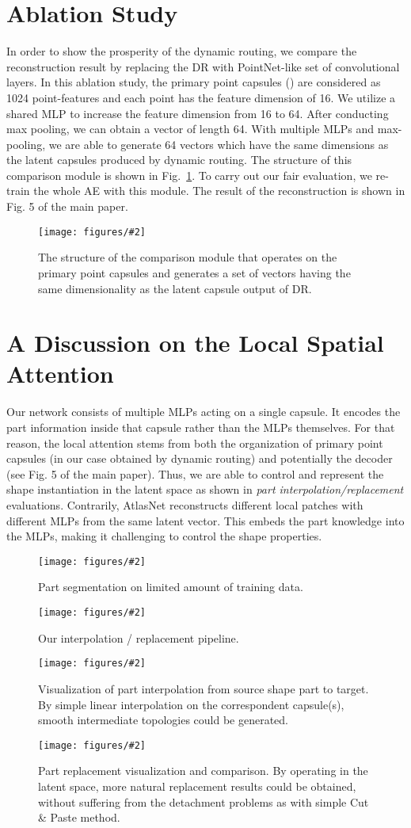 \documentclass[10pt,twocolumn,letterpaper]{article}
\theoremstyle{break}
\newcommand{\insertimageC}[5]{ \begin{figure}[#5]
\centering
\texttt{[image: figures/\#2]}
\caption{#3}
\label{#4}
\end{figure}
}
\newcommand{\insertimageStar}[5]{ \begin{figure*}[#5]
\centering
\texttt{[image: figures/\#2]}
\caption{#3}
\label{#4}
\end{figure*}
}
\begin{document}
\section{Ablation Study}
In order to show the prosperity of the dynamic routing, we compare the reconstruction result by replacing the DR with PointNet-like set of convolutional layers. In this ablation study, the primary point capsules () are considered as 1024 point-features and each point has the feature dimension of 16. We utilize a shared MLP to increase the feature dimension from 16 to 64. After conducting max pooling, we can obtain a vector of length 64. With multiple MLPs and max-pooling, we are able to generate 64 vectors which have the same dimensions as the latent capsules produced by dynamic routing. The structure of this comparison module is shown in Fig.~\ref{fig:supp-convcompare}. To carry out our fair evaluation, we re-train the whole AE with this module. The result of the reconstruction is shown in Fig. 5 of the main paper.
\insertimageC{1}{conv_compare.pdf}{The structure of the comparison module that operates on the primary point capsules and generates a set of vectors having the same dimensionality as the latent capsule output of DR.}{fig:supp-convcompare}{hbtp}

\section{A Discussion on the Local Spatial Attention}
Our network consists of multiple MLPs acting on a single capsule. It encodes the part information inside that capsule rather than the MLPs themselves.
For that reason, the local attention stems from both the organization of primary point capsules (in our case obtained by dynamic routing) and potentially the decoder (see Fig. 5 of the main paper). Thus, we are able to control and represent the shape instantiation in the latent space as shown in \textit{part interpolation/replacement} evaluations. 
Contrarily, AtlasNet reconstructs different local patches with different MLPs from the same latent vector. This embeds the part knowledge into the MLPs, making it challenging to control the shape properties. 

\insertimageStar{1}{supp-part-seg01_cropped.pdf}{Part segmentation on limited amount of training data.}{fig:supp-partseg}{b!}
\insertimageStar{1}{pipeline-interp_cropped.pdf}{Our interpolation / replacement pipeline.}{fig:pipeline-interp}{hbtp}
\insertimageStar{1}{supp-interpolation_cropped.pdf}{Visualization of part interpolation from source shape part to target. By simple linear interpolation on the correspondent capsule(s), smooth intermediate topologies could be generated. }{fig:supp-partinterp}{hbtp}

\insertimageStar{1}{supp-part-rep01_cropped.pdf}{Part replacement visualization and comparison. By operating in the latent space, more natural replacement results could be obtained, without suffering from the detachment problems as with simple Cut \& Paste method.}{fig:supp-partrep}{hbtp} 
\end{document}
